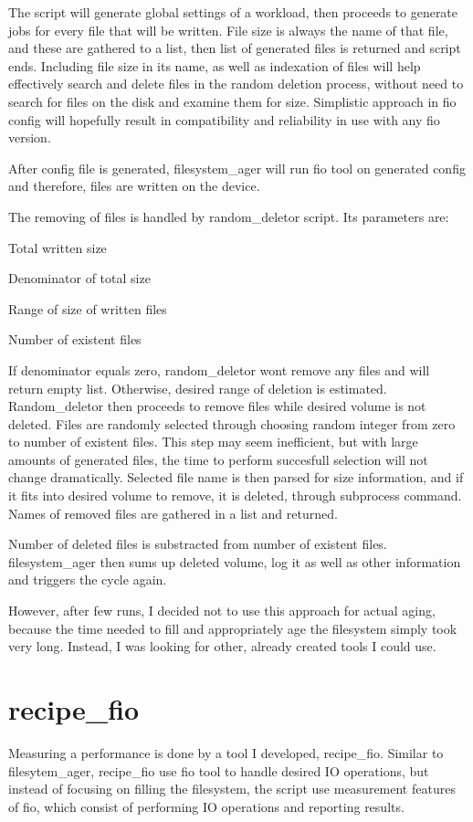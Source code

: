 \documentclass[
  color, %
  table, %
  lof,   %
  lot,   %
]{fithesis3}
\begin{document}
The script will generate global settings of a workload, then proceeds to generate jobs for every file that will be written. File size is always the name of that file, and these are gathered to a list, then list of generated files is returned and script ends. Including file size in its name, as well as indexation of files will help effectively search and delete files in the random deletion process, without need to search for files on the disk and examine them for size. Simplistic approach in fio config will hopefully result in compatibility and reliability in use with any fio version.

After config file is generated, filesystem\_ager will run fio tool on generated config and therefore, files are written on the device.

The removing of files is handled by random\_deletor script. Its parameters are:
\begin{compactenum}
  \item Total written size
  \item Denominator of total size
  \item Range of size of written files
  \item Number of existent files
\end{compactenum}

If denominator equals zero, random\_deletor wont remove any files and will return empty list. Otherwise, desired range of deletion is estimated. Random\_deletor then proceeds to remove files while desired volume is not deleted. Files are randomly selected through choosing random integer from zero to number of existent files. This step may seem inefficient, but with large amounts of generated files, the time to perform succesfull selection will not change dramatically. Selected file name is then parsed for size information, and if it fits into desired volume to remove, it is deleted, through subprocess command. Names of removed files are gathered in a list and returned.

Number of deleted files is substracted from number of existent files.
filesystem\_ager then sums up deleted volume, log it as well as other information and triggers the cycle again.

However, after few runs, I decided not to use this approach for actual aging, because the time needed to fill and appropriately age the filesystem simply took very long. Instead, I was looking for other, already created tools I could use.


\section{recipe\_fio}
Measuring a performance is done by a tool I developed, recipe\_fio. Similar to filesytem\_ager, recipe\_fio use fio tool to handle desired IO operations, but instead of focusing on filling the filesystem, the script use measurement features of fio, which consist of performing IO operations and reporting results.
\end{document}
